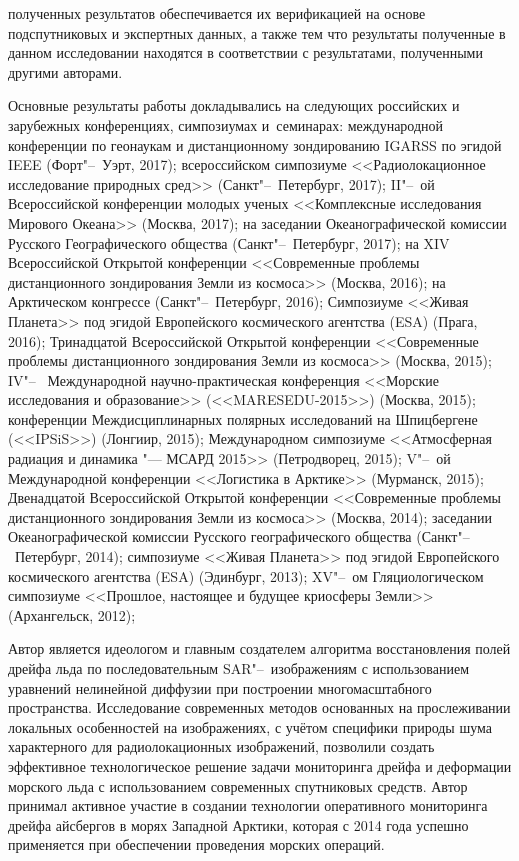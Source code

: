 {\reliability} полученных результатов обеспечивается их верификацией на основе подспутниковых и экспертных данных, а также тем что результаты полученные в данном исследовании находятся в соответствии с результатами, полученными другими авторами. 

{\probation}
Основные результаты работы докладывались на следующих российских и зарубежных конференциях, симпозиумах и~семинарах: международной конференции по геонаукам и дистанционному зондированию IGARSS по эгидой IEEE (Форт"--~Уэрт, 2017); всероссийском симпозиуме <<Радиолокационное исследование природных сред>> (Санкт"--~Петербург, 2017); II"--~ой Всероссийской конференции молодых ученых <<Комплексные исследования Мирового Океана>> (Москва, 2017); на заседании Океанографической комиссии Русского Географического общества (Санкт"--~Петербург, 2017); на XIV Всероссийской Открытой конференции <<Современные проблемы дистанционного зондирования Земли из космоса>> (Москва, 2016); на Арктическом конгрессе (Санкт"--~Петербург, 2016); Симпозиуме <<Живая Планета>> под эгидой Европейского космического агентства (ESA) (Прага, 2016); Тринадцатой Всероссийской Открытой конференции <<Современные проблемы дистанционного зондирования Земли из космоса>> (Москва, 2015); IV"--~ Международной научно-практическая конференция <<Морские исследования и образование>> (<<MARESEDU-2015>>) (Москва, 2015); конференции Междисциплинарных полярных исследований на Шпицбергене (<<IPSiS>>) (Лонгиир, 2015); Международном симпозиуме <<Атмосферная радиация и динамика "--- МСАРД 2015>> (Петродворец, 2015); V"--~ой Международной конференции <<Логистика в Арктике>> (Мурманск, 2015); Двенадцатой Всероссийской Открытой конференции <<Современные проблемы дистанционного зондирования Земли из космоса>> (Москва, 2014); заседании Океанографической комиссии Русского географического общества (Санкт"--~Петербург, 2014); симпозиуме <<Живая Планета>> под эгидой Европейского космического агентства (ESA) (Эдинбург, 2013); XV"--~ом Гляциологическом симпозиуме <<Прошлое, настоящее и будущее криосферы Земли>> (Архангельск, 2012);

{\contribution} Автор является идеологом и главным создателем алгоритма восстановления полей дрейфа льда по последовательным SAR"--~изображениям с использованием уравнений нелинейной диффузии при построении многомасштабного пространства. Исследование современных методов основанных на прослеживании локальных особенностей на изображениях, с учётом специфики природы шума характерного для радиолокационных изображений, позволили создать эффективное технологическое решение задачи мониторинга дрейфа и деформации морского льда с использованием современных спутниковых средств. Автор принимал активное участие в создании технологии оперативного мониторинга дрейфа айсбергов в морях Западной Арктики, которая с 2014 года успешно применяется при обеспечении проведения морских операций.

